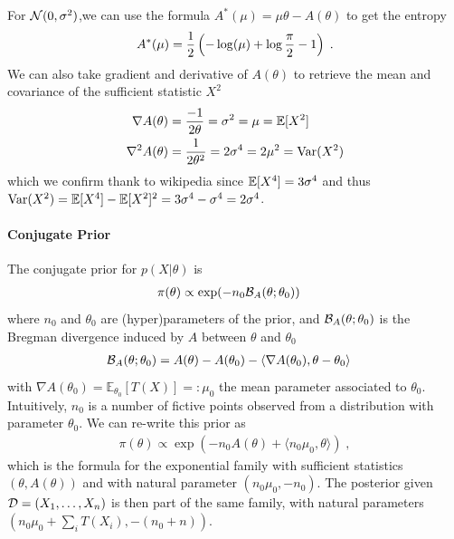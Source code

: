 \documentclass{article}
\newcommand*{\expect}[2][]{\ensuremath{\mathbb{E}_{#1} \left[ #2 \right] }} %
\newcommand{\logpart}{A}
\newcommand{\conj}{\logpart^*}
\newcommand{\bregman}{\cB_\logpart}
\newcommand{\natp}{\theta}
\newcommand{\meanp}{\mu}
\begin{document}
\begin{example}
For ${\mathcal N}(0,\sigma^2)$,we can use the formula $\conj(\mu) = \mu \natp - \logpart(\natp)$ to get the entropy
\begin{align}
	\conj(\mu) = \half\left( -\log(\mu) + \log\frac{\pi}{2} - 1 \right) \; .
\end{align}
We can also take gradient and derivative of $\logpart(\natp)$ to retrieve the mean and covariance of the sufficient statistic $X^2$
\begin{align}
	\nabla\logpart(\natp) &= \frac{-1}{2 \natp} = \sigma^2 = \mu = \E[X^2] \\
	\nabla^2\logpart(\natp) &= \frac{1}{2 \natp^2} = 2 \sigma^4 = 2 \mu^2 = \Var(X^2) 
\end{align}
which we confirm thank to wikipedia since $\operatorname{\mathbb{E}}[X^4] = 3 \sigma^4$ and thus $\operatorname{\mathrm{Var}}(X^2) = \operatorname{\mathbb{E}}[X^4] - \operatorname{\mathbb{E}}[X^2]^2 = 3 \sigma^4 - \sigma^4 = 2 \sigma^4$.
\end{example}

\paragraph{Conjugate Prior}
The conjugate prior for $p(X|\natp)$ is
\begin{align}
    \pi(\natp) &\propto \exp( - n_0 \bregman(\natp ; \natp_0) )
\end{align}
where $n_0$ and $\natp_0$ are (hyper)parameters of the prior, and $\bregman(\natp ; \natp_0)$ is the Bregman divergence induced by $\logpart$ between $\natp$ and $\natp_0$
\begin{align}
    \bregman (\natp ; \natp_0)
    & = \logpart(\natp) - \logpart(\natp_0) 
    - \langle \nabla \logpart(\natp_0)  , \natp - \natp_0 \rangle
\end{align}
with $\nabla \logpart(\natp_0) = \expect[\natp_0]{T(X)} =: \meanp_0$ the mean parameter associated to $\natp_0$. 
Intuitively, $n_0$ is a number of fictive points observed from a distribution with parameter $\natp_0$.
We can re-write this prior as 
\begin{align}
    \pi(\natp) \propto 
    \exp( -n_0 \logpart (\natp) 
    + \langle n_0 \mu_0, \natp \rangle ) \; ,
\end{align}
which is the formula for the exponential family with sufficient statistics $(\natp ,\logpart(\natp))$ and with natural parameter $(n_0 \mu_0, -n_0)$.
The posterior given ${\mathcal D}=(X_1,\dots, X_n)$ is then part of the same family, with natural parameters $(n_0 \mu_0 + \sum_i T(X_i) , -(n_0 + n))$.
\end{document}
